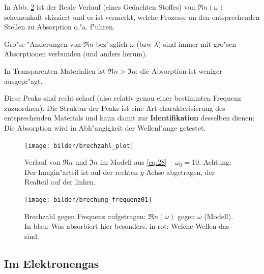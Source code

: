 \documentclass[twoside,a4paper]{book}
\newenvironment*{Einschub}[0]{$\rightarrow$ \indent}{$\leftarrow$}
\begin{document}
In Abb. \ref{fig:brechzahl_frequenz} ist der Reale Verlauf (eines
Gedachten Stoffes) von $\Re
n(\omega)$ schemenhaft skizziert und es ist vermerkt, welche Prozesse
an den entsprechenden Stellen zu Absorption o."a. f"uhren.


\begin{Wichtig}
   Gro"se "Anderungen von $\Re n$ bez"uglich $\omega$ (bzw $\lambda$)
   sind immer mit gro"sen Absorptionen verbunden (und anders herum).

   In Transparenten Materialien ist $\Re n > \Im n$; die Absorption
   ist weniger ausgepr"agt.
\end{Wichtig}

Diese Peaks sind recht scharf (also relativ genau einer bestimmten
Frequenz zuzuordnen). Die Struktur der Peaks ist eine Art
charakterisierung des entsprechenden Materials und kann damit zur
\textbf{Identifikation} desselben dienen: Die Absorption wird in
Abh"angigkeit der Wellenl"ange getestet.



\begin{figure}
   \centering
   \texttt{[image: bilder/brechzahl\_plot]}
   \caption[Plot von $\Im n$ und $\Re n$ \eqref{eq:28}]{Verlauf von
     $\Re n$ und $\Im n$ im Modell aus \eqref{eq:28} -- $\omega_0 =
     10$. Achtung: Der Imagin"arteil ist auf der rechten $y$-Achse
     abgetragen, der Realteil auf der linken.}
   \label{fig_brechzahl_plot}
\end{figure}
\begin{figure}
   \centering
   \texttt{[image: bilder/brechung\_frequenz01]}
   \caption[Brechzahl gegen Frequenz]{Brechzahl gegen Frequenz
     aufgetragen: $\Re n(\omega)$ gegen $\omega$ (Modell). In blau: Was
     absorbiert hier besonders, in rot: Welche Wellen das sind.}
   \label{fig:brechzahl_frequenz}
\end{figure}














\subsection{Im Elektronengas}
\label{kap_im-elektronengas}
\end{document}
